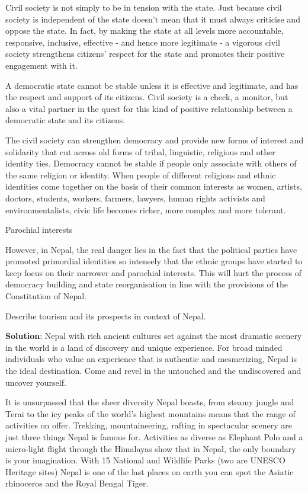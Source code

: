 \documentclass[
  openany]{book}
\newcommand{\question}{\item}
\newenvironment{solution}{ {\bfseries Solution}:}{}
\begin{document}
\begin{questions}
Civil society is not simply to be in tension with the state. Just because civil society is independent of the state doesn't mean that it must always criticise and oppose the state. In fact, by making the state at all levels more accountable, responsive, inclusive, effective - and hence more legitimate - a vigorous civil society strengthens citizens' respect for the state and promotes their positive engagement with it.

A democratic state cannot be stable unless it is effective and legitimate, and has the respect and support of its citizens.  Civil society is a check, a monitor, but also a vital partner in the quest for this kind of positive relationship between a democratic state and its citizens.

The  civil society can strengthen democracy and provide new forms of interest and solidarity that cut across old forms of tribal, linguistic, religious and other identity ties. Democracy cannot be stable if people only associate with others of the same religion or identity. When people of different religions and ethnic identities come together on the basis of their common interests as women, artists, doctors, students, workers, farmers, lawyers, human rights activists and environmentalists, civic life becomes richer, more complex and more tolerant.

Parochial interests

However, in Nepal, the real danger lies in the fact that the political parties have promoted primordial identities so intensely that the ethnic groups have started to keep focus on their narrower and parochial interests. This will hurt the process of democracy building and state reorganisation in line with the provisions of the Constitution of Nepal.

\question Describe tourism and its prospects in context of Nepal.

\begin{solution}
Nepal with rich ancient cultures set against the most dramatic scenery in the world is a land of discovery and unique experience. For broad minded individuals who value an experience that is authentic and mesmerizing, Nepal is the ideal destination. Come and revel in the untouched and the undiscovered and uncover yourself.

It is unsurpassed that the sheer diversity Nepal boasts, from steamy jungle and Terai to the icy peaks of the world’s highest mountains means that the range of activities on offer. Trekking, mountaineering, rafting in spectacular scenery are just three things Nepal is famous for. Activities as diverse as Elephant Polo and a micro-light flight through the Himalayas show that in Nepal, the only boundary is your imagination. With 15 National and Wildlife Parks (two are UNESCO Heritage sites) Nepal is one of the last places on earth you can spot the Asiatic rhinoceros and the Royal Bengal Tiger.


\end{solution}
\end{questions}
\end{document}
